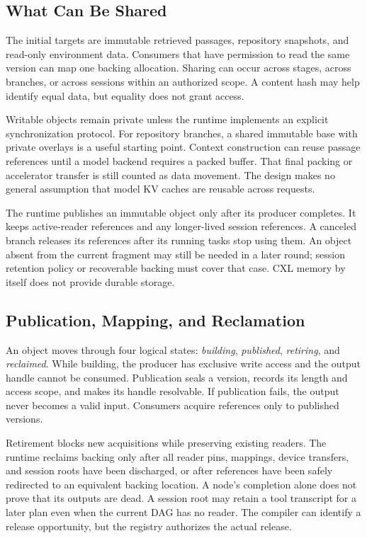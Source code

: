 \documentclass[letterpaper,twocolumn,10pt]{article}
\begin{document}
\subsection{What Can Be Shared}

The initial targets are immutable retrieved passages, repository snapshots,
and read-only environment data. Consumers that have permission to read the
same version can map one backing allocation. Sharing can occur across stages,
across branches, or across sessions within an authorized scope. A content hash
may help identify equal data, but equality does not grant access.

Writable objects remain private unless the runtime implements an explicit
synchronization protocol. For repository branches, a shared immutable base
with private overlays is a useful starting point. Context construction can
reuse passage references until a model backend requires a packed buffer.
That final packing or accelerator transfer is still counted as data movement.
The design makes no general assumption that model KV caches are reusable
across requests.

The runtime publishes an immutable object only after its producer completes.
It keeps active-reader references and any longer-lived session references.
A canceled branch releases its references after its running tasks stop using
them. An object absent from the current fragment may still be needed in a
later round; session retention policy or recoverable backing must cover that
case. CXL memory by itself does not provide durable storage.

\subsection{Publication, Mapping, and Reclamation}
\label{sec:protocol}

An object moves through four logical states: \emph{building},
\emph{published}, \emph{retiring}, and \emph{reclaimed}. While building, the
producer has exclusive write access and the output handle cannot be consumed.
Publication seals a version, records its length and access scope, and makes
its handle resolvable. If publication fails, the output never becomes a valid
input. Consumers acquire references only to published versions.

Retirement blocks new acquisitions while preserving existing readers. The
runtime reclaims backing only after all reader pins, mappings, device
transfers, and session roots have been discharged, or after references have
been safely redirected to an equivalent backing location. A node's completion
alone does not prove that its outputs are dead. A session root may retain a
tool transcript for a later plan even when the current DAG has no reader.
The compiler can identify a release opportunity, but the registry authorizes
the actual release.
\end{document}
